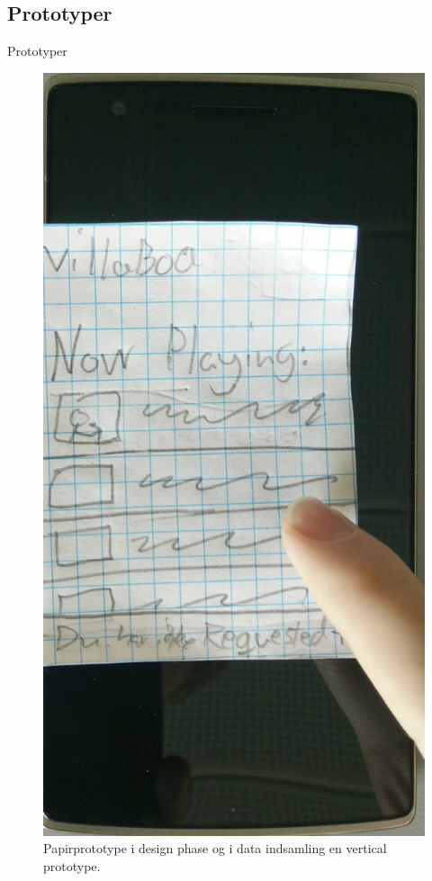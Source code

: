 \subsection{Prototyper}
\begin{frame}{Prototyper}
	\begin{figure}
		\centering
		\includegraphics[width=\textwidth]{slides/Heider/paperPrototypeVoteInteraction}
		Papirprototype i design phase og i data indsamling en vertical prototype.
	\end{figure}
\end{frame}
